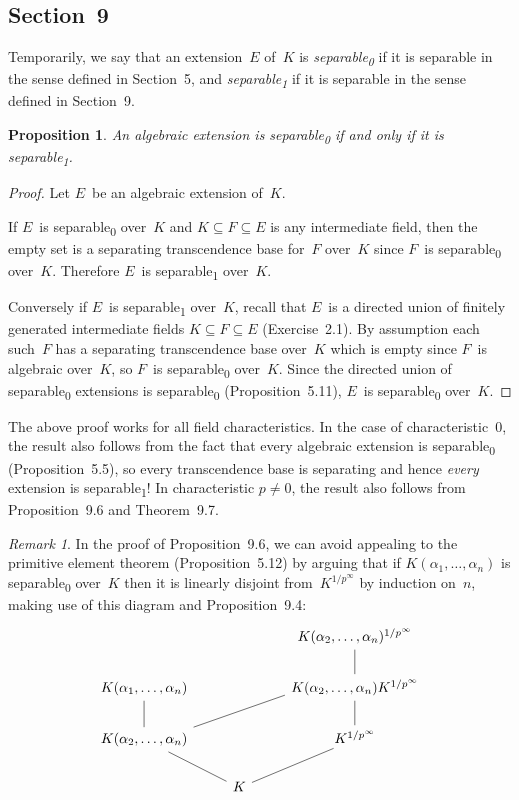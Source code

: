 \documentclass[letterpaper,12pt]{article}
\newcommand{\sub}{\textsubscript}
\theoremstyle{definition}
\theoremstyle{remark}
\newtheorem*{rmk}{Remark}
\theoremstyle{plain}
\newtheorem*{prop}{Proposition}
\begin{document}
\subsection*{Section~9}
Temporarily, we say that an extension~\(E\) of~\(K\) is \emph{separable\sub{0}} if it is separable in the sense defined in Section~5, and \emph{separable\sub{1}} if it is separable in the sense defined in Section~9.

\begin{prop}
An algebraic extension is separable\sub{0} if and only if it is separable\sub{1}.
\end{prop}
\begin{proof}
Let \(E\)~be an algebraic extension of~\(K\).

If \(E\)~is separable\sub{0} over~\(K\) and \(K\subseteq F\subseteq E\) is any intermediate field, then the empty set is a separating transcendence base for~\(F\) over~\(K\) since \(F\)~is separable\sub{0} over~\(K\). Therefore \(E\)~is separable\sub{1} over~\(K\).

Conversely if \(E\)~is separable\sub{1} over~\(K\), recall that \(E\)~is a directed union of finitely generated intermediate fields \(K\subseteq F\subseteq E\) (Exercise~2.1). By assumption each such~\(F\) has a separating transcendence base over~\(K\) which is empty since \(F\)~is algebraic over~\(K\), so \(F\)~is separable\sub{0} over~\(K\). Since the directed union of separable\sub{0} extensions is separable\sub{0} (Proposition~5.11), \(E\)~is separable\sub{0} over~\(K\).
\end{proof}
\noindent The above proof works for all field characteristics. In the case of characteristic~\(0\), the result also follows from the fact that every algebraic extension is separable\sub{0} (Proposition~5.5), so every transcendence base is separating and hence \emph{every} extension is separable\sub{1}! In characteristic \(p\ne 0\), the result also follows from Proposition~9.6 and Theorem~9.7.

\begin{rmk}
In the proof of Proposition~9.6, we can avoid appealing to the primitive element theorem (Proposition~5.12) by arguing that if \(K(\alpha_1,\ldots,\alpha_n)\) is separable\sub{0} over~\(K\) then it is linearly disjoint from~\(K^{1/p^{\infty}}\) by induction on~\(n\), making use of this diagram and Proposition~9.4:
\[\begin{tikzcd}
							&	&K(\alpha_2,\ldots,\alpha_n)^{1/p^{\infty}}\\
K(\alpha_1,\ldots,\alpha_n)	&	&K(\alpha_2,\ldots,\alpha_n)K^{1/p^{\infty}}\\
K(\alpha_2,\ldots,\alpha_n)	&	&K^{1/p^{\infty}}\\
							&K
\arrow[no head, from=2-3, to=1-3]
\arrow[no head, from=3-1, to=2-1]
\arrow[no head, from=3-1, to=2-3, start anchor=north east, end anchor={[yshift=4pt]south west}]
\arrow[no head, from=3-3, to=2-3]
\arrow[no head, from=4-2, to=3-1]
\arrow[no head, from=4-2, to=3-3]
\end{tikzcd}\]
\end{rmk}
\end{document}
